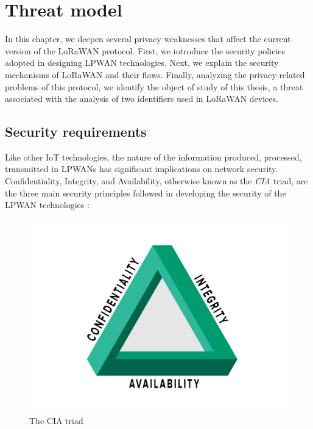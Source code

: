 \chapter{Threat model}
\label{model}
In this chapter, we deepen several privacy weaknesses that affect the current version of the LoRaWAN protocol. First, we introduce the security policies adopted in designing LPWAN technologies. Next, we explain the security mechanisms of LoRaWAN and their flaws. Finally, analyzing the privacy-related problems of this protocol, we identify the object of study of this thesis, a threat associated with the analysis of two identifiers used in LoRaWAN devices.

\section{Security requirements}
Like other IoT technologies, the nature of the information produced, processed, transmitted in LPWANs has significant implications on network security. Confidentiality, Integrity, and Availability, otherwise known as the \textit{CIA} triad, are the three main security principles followed in developing the security of the LPWAN technologies \cite{AdefemiAlimi2020}: 
\begin{figure}[ht]
    \centering
    \includegraphics[width=0.5\linewidth]{images/threat/cia_triad.png}
    \caption{The CIA triad}
    \label{fig:triad}
\end{figure}


